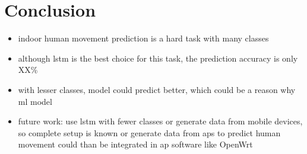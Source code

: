 \chapter{Conclusion}

\begin{itemize}
    \item indoor human movement prediction is a hard task with many classes
    \item although \ac{lstm} is the best choice for this task, the prediction accuracy is only XX\%
    \item with lesser classes, model could predict better, which could be a reason why \ac{ml} model 
    \item future work: use \ac{lstm} with fewer classes 
    \subitem or generate data from mobile devices, so complete setup is known
    \subitem or generate data from \acp{ap} to predict human movement 
    \subitem could than be integrated in \acs{ap} software like OpenWrt
\end{itemize}

